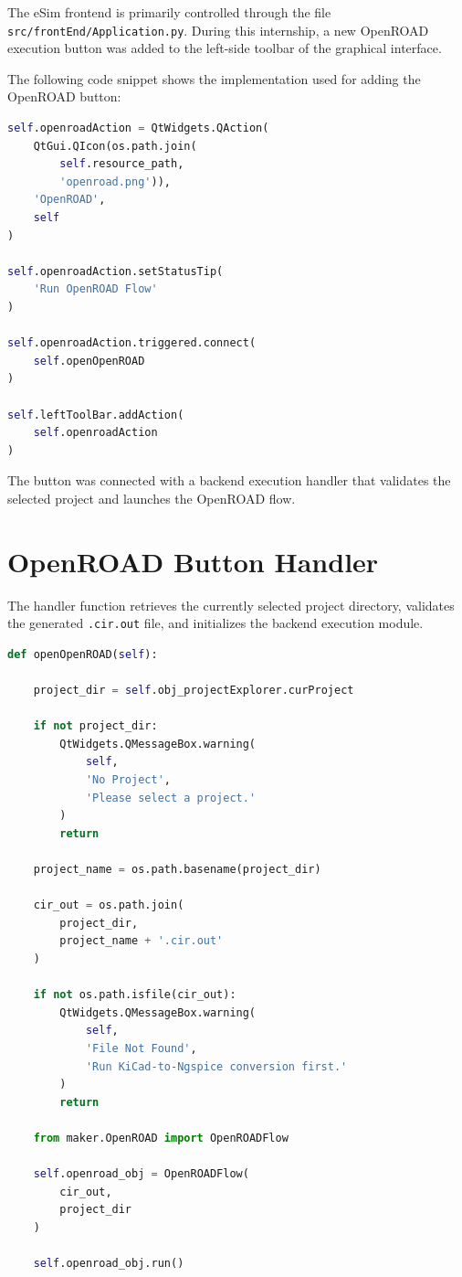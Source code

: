 The eSim frontend is primarily controlled through the file \texttt{src/frontEnd/Application.py}. During this internship, a new OpenROAD execution button was added to the left-side toolbar of the graphical interface.

The following code snippet shows the implementation used for adding the OpenROAD button:

\begin{lstlisting}[language=python,
caption={Adding the OpenROAD button inside Application.py.}]
self.openroadAction = QtWidgets.QAction(
    QtGui.QIcon(os.path.join(
        self.resource_path,
        'openroad.png')),
    'OpenROAD',
    self
)

self.openroadAction.setStatusTip(
    'Run OpenROAD Flow'
)

self.openroadAction.triggered.connect(
    self.openOpenROAD
)

self.leftToolBar.addAction(
    self.openroadAction
)
\end{lstlisting}

The button was connected with a backend execution handler that validates the selected project and launches the OpenROAD flow.

\section{OpenROAD Button Handler}

The handler function retrieves the currently selected project directory, validates the generated \texttt{.cir.out} file, and initializes the backend execution module.

\begin{lstlisting}[language=python,
caption={OpenROAD execution handler in Application.py.}]
def openOpenROAD(self):

    project_dir = self.obj_projectExplorer.curProject

    if not project_dir:
        QtWidgets.QMessageBox.warning(
            self,
            'No Project',
            'Please select a project.'
        )
        return

    project_name = os.path.basename(project_dir)

    cir_out = os.path.join(
        project_dir,
        project_name + '.cir.out'
    )

    if not os.path.isfile(cir_out):
        QtWidgets.QMessageBox.warning(
            self,
            'File Not Found',
            'Run KiCad-to-Ngspice conversion first.'
        )
        return

    from maker.OpenROAD import OpenROADFlow

    self.openroad_obj = OpenROADFlow(
        cir_out,
        project_dir
    )

    self.openroad_obj.run()
\end{lstlisting}

